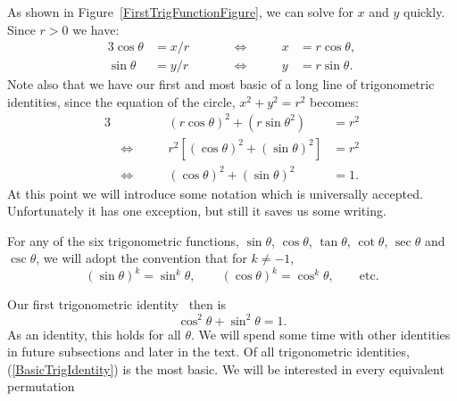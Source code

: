 As shown in Figure~\ref{FirstTrigFunctionFigure}, 
we can solve for $x$ and $y$ quickly.  Since $r>0$ we have:
\begin{alignat*}{3}
\cos\theta&=x/r\qquad&&\iff\qquad&x&=r\cos\theta,\\
\sin\theta&=y/r&&\iff&y&=r\sin\theta.\end{alignat*}
Note also that we have our first and most basic
of a long line of trigonometric identities, since
the equation of the circle, $x^2+y^2=r^2$ becomes:
\begin{alignat*}{3}
&&(r\cos\theta)^2+(r\sin\theta^2)&=r^2\\
&\iff\qquad&r^2\left[(\cos\theta)^2+(\sin\theta)^2\right]&=r^2\\
&\iff&(\cos\theta)^2+(\sin\theta)^2&=1.\end{alignat*}
At this point we will introduce some notation which is universally
accepted.  Unfortunately it has one exception, but still it
saves us some writing.
\begin{definition}For any of the six trigonometric functions,
$\sin\theta$, $\cos\theta$, $\tan\theta$, $\cot\theta$, $\sec\theta$
and $\csc\theta$, we will adopt the convention
that for $k\ne-1$,\footnotemark
$$(\sin\theta)^k=\sin^k\theta,\qquad (\cos\theta)^k=\cos^k\theta,
\qquad\text{etc.}$$
\end{definition}
Our first trigonometric identity\footnotemark
\  then is
\begin{equation}
\cos^2\theta+\sin^2\theta=1.\label{BasicTrigIdentity}\end{equation}
As an identity, this holds for all $\theta$.
We will spend some time with other identities in future
subsections and later in the text.  Of all trigonometric
identities, (\ref{BasicTrigIdentity}) is the most basic.
We will be interested in every equivalent permutation
